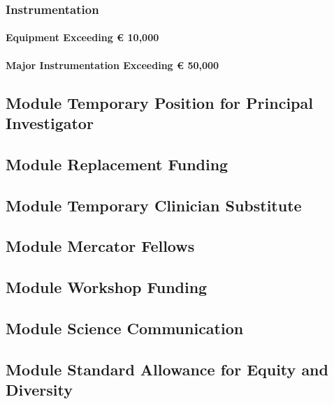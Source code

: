 \documentclass[de]{dfg-proposal}
\begin{document}
\subsubsection{Instrumentation}

\paragraph{Equipment Exceeding € 10,000}

\paragraph{Major Instrumentation Exceeding € 50,000}

\subsection{Module Temporary Position for Principal Investigator}

\subsection{Module Replacement Funding}

\subsection{Module Temporary Clinician Substitute}

\subsection{Module Mercator Fellows}

\subsection{Module Workshop Funding}

\subsection{Module Science Communication}

\subsection{Module Standard Allowance for Equity and Diversity}
\end{document}
